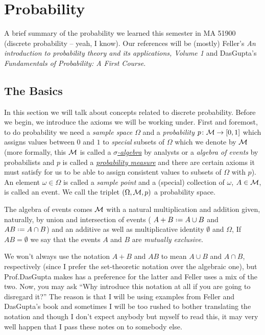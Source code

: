 \chapter{Probability}
A brief summary of the probability we learned this semester in MA 51900
(discrete probability -- yeah, I know). Our references will be (mostly)
Feller's \emph{An introduction to probability theory and its applications,
  Volume 1} \cite{feller} and DasGupta's \emph{Fundamentals of Probability:
A First Course}\cite{dasgupta}.

\section{The Basics}
In this section we will talk about concepts related to discrete
probability. Before we begin, we introduce the axioms we will be working
under. First and foremost, to do probability we need a \emph{sample space
  \(\Omega\)} and a \emph{probability \(p\colon\mathcal{M}\to[0,1]\)} which
assigns values between \(0\) and \(1\) to \emph{special} subsets of
\(\Omega\) which we denote by \(\mathcal{M}\) (more formally, this \(\mathcal{M}\) is
called a
\href{https://en.wikipedia.org/wiki/Sigma-algebra}{\emph{\(\sigma\)-algebra}}
by analysts or a \emph{algebra of events} by probabilists and \(p\) is
called a
\href{https://en.wikipedia.org/wiki/Probability_measure}{\emph{probability
    measure}} and there are certain axioms it must satisfy for us to be
able to assign consistent values to subsets of \(\Omega\) with \(p\)). An
element \(\omega\in\Omega\) is called a \emph{sample point} and a (special)
collection of \(\omega\), \(A\in\mathcal{M}\), is called an event. We call the
triplet \((\Omega,\mathcal{M},p)\) a probability space.

The algebra of events comes \(\mathcal{M}\) with a natural multiplication and
addition given, naturally, by union and intersection of events (\ie{}
\(A+B\defeq A\cup B\) and \(AB\defeq A\cap B\)) and an additive as well as
multiplicative identity \(\emptyset\) and \(\Omega\), \etc{} If
\(AB=\emptyset\) we say that the events \(A\) and \(B\) are \emph{mutually
  exclusive}.
\begin{remark}
  We won't always use the notation \(A+B\) and \(AB\) to mean \(A\cup B\)
  and \(A\cap B\), respectively (since I prefer the set-theoretic notation
  over the algebraic one), but Prof.\@ DasGupta makes has a preference for
  the latter and Feller uses a mix of the two. Now, you may ask ``Why
  introduce this notation at all if you are going to disregard it?'' The
  reason is that I will be using examples from Feller and DasGupta's book
  and sometimes I will be too rushed to bother translating the notation and
  though I don't expect anybody but myself to read this, it may very well
  happen that I pass these notes on to somebody else.
\end{remark}

